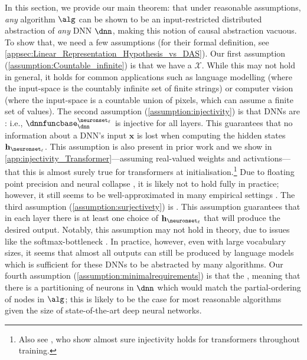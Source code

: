 \documentclass{article}
\newcommand{\bx}{\mathbf{x}}
\newcommand{\calX}{\mathcal{X}}
\newcommand{\dnnfunclayer}[1]{\dnnfuncbase_{\dnn}^{#1}}
\newcommand{\layer}{\ell}
\newcommand{\hiddenstates}{\mathbf{h}}
\begin{document}
In this section, we provide our main theorem: that under reasonable assumptions, \emph{any} algorithm $\alg$ can be shown to be an input-restricted distributed abstraction of \emph{any} DNN $\dnn$, making this notion of causal abstraction vacuous.
To show that, we need a few assumptions (for their formal definition, see \cref{appsec:Linear_Representation_Hypothesis_vs_DAS}). 
Our first assumption (\cref{assumption:Countable_infinite}) is that we have a  $\calX$.
While this may not hold in general, it holds for common applications such as language modelling (where the input-space is the countably infinite set of finite strings) or computer vision (where the input-space is a countable union of pixels, which can assume a finite set of values).
The second assumption
(\cref{assumption:injectivity}) is that DNNs are : i.e., $\dnnfunclayer{\neuronset_\layer}$ is injective for all layers.
This guarantees that no information about a DNN's input $\bx$ is lost when computing the hidden states $\hiddenstates_{\neuronset_\layer}$.
This assumption is also present in prior work \citep[e.g.,][]{pimentel-etal-2020-information} and we show in \cref{app:injectivity_Transformer}---assuming real-valued weights and activations---that this is almost surely true for transformers at initialisation.\footnote{
Also see \citet{nikolaou2025languagemodelsinjectiveinvertible}, who show almost sure injectivity holds for transformers throughout training.}
Due to floating point precision and neural collapse \citep{Papyan_2020}, it is likely not to hold fully in practice; however, it still seems to be well-approximated in many empirical settings \citep[and \cref{appsec:MLP_Injectivity_in_Hierarchical_Equality_Task}]{morris-etal-2023-text}. 
The third assumption (\cref{assumption:surjectivety}) is  .
This assumption guarantees that in each layer there is at least one choice of $\hiddenstates_{\neuronset_{\layer}}$ that will produce the desired output.
Notably, this assumption may not hold in theory, due to issues like the softmax-bottleneck \citep{yang2018breaking}.
In practice, however, even with large vocabulary sizes, it seems that almost all outputs can still be produced by language models \citep{grivas-etal-2022-low} which is sufficient for these DNNs to be abstracted by many algorithms.
Our fourth assumption (\cref{assumption:minimalrequirements}) is that the , meaning that there is a partitioning of neurons in $\dnn$ which would match the partial-ordering of nodes in $\alg$; this is likely to be the case for most reasonable algorithms given the size of state-of-the-art deep neural networks.
\end{document}
